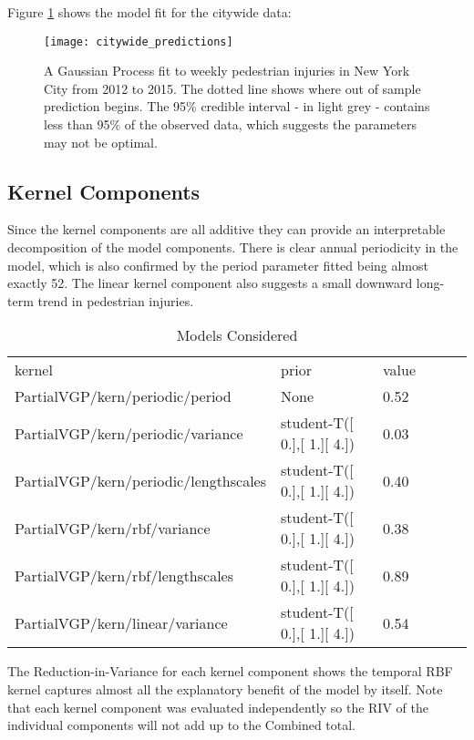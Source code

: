  Figure \ref{city_preds} shows the model fit for the citywide data:

 \begin{figure}[h!]
   \centering
   \caption{A Gaussian Process fit to weekly pedestrian injuries in New York City from 2012 to 2015. The dotted line shows where out of sample prediction begins. The 95\% credible interval - in light grey - contains less than 95\% of the observed data, which suggests the parameters may not be optimal.}
   \texttt{[image: citywide\_predictions]}
   \label{city_preds}
 \end{figure}

\subsection{Kernel Components}

Since the kernel components are all additive they can provide an interpretable decomposition of the model components. There is clear annual periodicity in the model, which is also confirmed by the period parameter fitted being almost exactly 52. The linear kernel component also suggests a small downward long-term trend in pedestrian injuries.

\begin{table}[h!]
\centering
\caption{Models Considered}
\label{citywide_parameters}
\begin{tabular}{@{}llllll@{}}
\toprule
kernel                                      & prior                                   & value \\
PartialVGP/kern/periodic/period       & None                                    & 0.52 \\
PartialVGP/kern/periodic/variance     & student-T({[} 0.{]},{[} 1.{]}{[} 4.{]}) & 0.03  \\
PartialVGP/kern/periodic/lengthscales & student-T({[} 0.{]},{[} 1.{]}{[} 4.{]}) & 0.40  \\
PartialVGP/kern/rbf/variance          & student-T({[} 0.{]},{[} 1.{]}{[} 4.{]}) & 0.38  \\
PartialVGP/kern/rbf/lengthscales      & student-T({[} 0.{]},{[} 1.{]}{[} 4.{]}) & 0.89  \\
PartialVGP/kern/linear/variance       & student-T({[} 0.{]},{[} 1.{]}{[} 4.{]}) & 0.54
\end{tabular}
\end{table}



The Reduction-in-Variance for each kernel component shows the temporal RBF kernel captures almost all the explanatory benefit of the model by itself. Note that each kernel component was evaluated independently so the RIV of the individual components will not add up to the Combined total. \par

